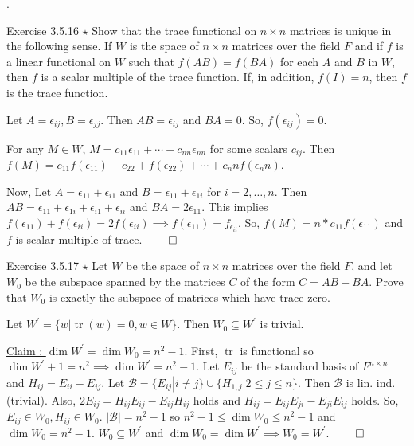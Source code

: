 \documentclass[8pt]{beamer}
\newcommand{\mc}[1]{\mathcal{#1}}
\newcommand{\abs}[1]{\left\lvert #1 \right\rvert}
\newcommand{\tr}{\operatorname{tr}}
\begin{document}
\begin{frame}{.}

    \begin{block}{Exercise 3.5.16 $\star$}
        Show that the trace functional on $n \times n$ matrices is unique in the following sense.
        If $W$ is the space of $n \times n$ matrices over the field $F$ and if $f$ is a linear functional on $W$ such that $f(AB) = f(BA)$ for each $A$ and $B$ in $W$, then $f$ is a scalar multiple of the trace function.
        If, in addition, $f(I) = n$, then $f$ is the trace function.

        \smallskip
        Let $A = \epsilon_{ij}, B=\epsilon_{jj}$.
        Then $AB = \epsilon_{ij}$ and $BA = 0$.
        So, $f(\epsilon_{ij}) = 0$.

        For any $M \in W$, $M = c_{11} \epsilon_{11} + \cdots + c_{nn} \epsilon_{nn}$ for some scalars $c_{ij}$.
        Then $f(M) = c_11 f(\epsilon_{11}) + c_22 + f(\epsilon_{22})+ \cdots + c_nn f(\epsilon_nn)$.
        
        Now, Let $A = \epsilon_{11} + \epsilon_{i1}$ and $B = \epsilon_{11} + \epsilon_{1i}$ for $i =2, \dots, n$.
        Then $AB = \epsilon_{11} + \epsilon_{1i} + \epsilon_{i1} + \epsilon_{ii}$ and $BA = 2 \epsilon_{11}$.
        This implies $f(\epsilon_{11}) + f(\epsilon_{ii}) = 2f(\epsilon_{ii}) \implies f(\epsilon_{11}) = f_{\epsilon_{ii}}$.
        So, $f(M) = n * c_{11} f(\epsilon_{11})$ and $f$ is scalar multiple of trace.
        $\qed$

    \end{block}

    \begin{block}{Exercise 3.5.17 $\star$}
        Let $W$ be the space of $n \times n$ matrices over the field $F$, and let $W_0$ be the subspace spanned by the matrices $C$ of the form $C = AB - BA$.
        Prove that $W_0$ is exactly the subspace of matrices which have trace zero. 
    \end{block}
    Let $W^\prime = \{w | \tr(w) =0, w \in W\}$.
    Then $W_0 \subseteq W^\prime$ is trivial.

    \underline{Claim : $\dim W^\prime = \dim W_0 = n^2-1$}.
    First, $\tr$ is functional so $\dim W^\prime +1 = n^2 \implies \dim W^\prime = n^2-1$.
    Let $E_{ij}$ be the standard basis of $F^{n \times n}$ and $H_{ij} = E_{ii} - E_{ij}$.
    Let $\mc{B} = \{E_{ij} | i \neq j\} \cup \{H_{1,j} | 2 \leq j \leq n\}$.
    Then $\mc{B}$ is lin. ind. (trivial).
    Also, $2E_{ij} = H_{ij}E_{ij} - E_{ij} H_{ij}$ holds and $H_{ij} = E_{ij}E_{ji} - E_{ji}E_{ij}$ holds.
    So, $E_{ij} \in W_0, H_{ij} \in W_0$.
    $\abs{\mc{B}} = n^2-1$ so $n^2-1 \leq \dim W_0 \leq n^2-1$ and $\dim W_0 = n^2-1$.
    $W_0 \subseteq W^\prime$ and $\dim W_0 = \dim W^\prime \implies W_0 = W^\prime$.
    $\qed$
\end{frame}
\end{document}
